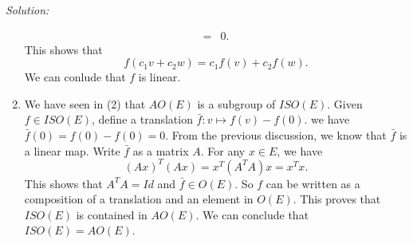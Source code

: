 \documentclass[a4paper, 12pt]{article}
\newenvironment{solution}
    {\textit{Solution:}}
    {}
\begin{document}
\begin{solution}
\begin{enumerate}
\begin{align*}
                                    =&0.
\end{align*}
This shows that 
\[f(c_1v+c_2w)=c_1f(v)+c_2f(w).\]
We can conlude that \(f\) is linear.
\item We have seen in (2) that \(AO(E)\) is a subgroup of \(ISO(E)\). Given \(f\in ISO(E)\), define a translation \(\bar{f}: v\mapsto f(v)-f(0)\). we have 
\(\bar{f}(0)=f(0)-f(0)=0\). From the previous discussion, we know that \(\bar{f}\) is a linear map. Write \(\bar{f}\) as a matrix \(A\). For any \(x\in E\), we have 
\[(Ax)^T(Ax)=x^T(A^TA)x=x^Tx.\]
This shows that \(A^TA=Id\) and \(\bar{f}\in O(E)\). So \(f\) can be written as a composition of a translation and an element in \(O(E)\). This proves that \(ISO(E)\) is contained in \(AO(E)\). We 
can conclude that \(ISO(E)=AO(E)\).
\end{enumerate} 
\end{solution}
\end{document}
